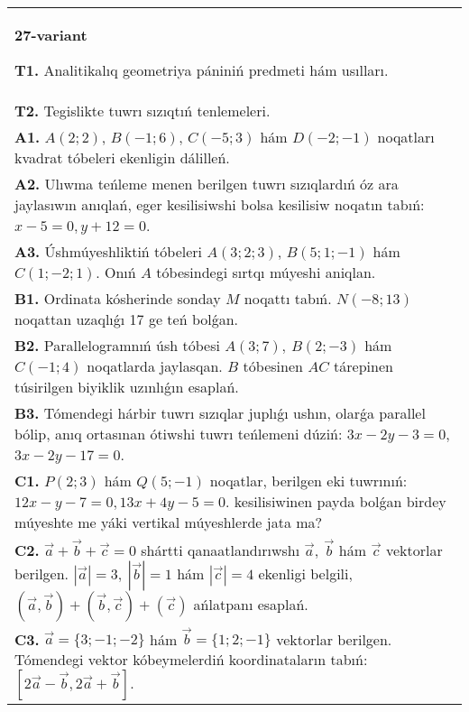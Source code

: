 \documentclass{article}
\begin{document}
\begin{tabular}{m{17cm}}
\textbf{27-variant}

\textbf{T1.} Analitikalıq geometriya pániniń predmeti hám usılları.
 \\
\textbf{T2.} 
Tegislikte tuwrı sızıqtıń tenlemeleri.
 \\
\textbf{A1.} 
$A (2;2) $, $B (-1;6) $, $C (-5;3) $ hám $D (-2;-1) $
noqatları kvadrat tóbeleri ekenligin dálilleń.
 \\
\textbf{A2.} 
Ulıwma teńleme menen berilgen tuwrı sızıqlardıń
óz ara jaylasıwın anıqlań, eger kesilisiwshi bolsa kesilisiw noqatın
tabıń: $x-5=0, y+12=0$.
 \\
\textbf{A3.} 
Úshmúyeshliktiń tóbeleri
$A (3;2; 3) $, $B (5;1; - 1) $ hám $C (1; -2;1) $. Onıń $A$ tóbesindegi sırtqı múyeshi aniqlan.
 \\
\textbf{B1.} 
Ordinata kósherinde sonday $M$ noqattı tabıń.
\(N (-8;13) \) noqattan uzaqlıǵı 17 ge teń bolǵan.
 \\
\textbf{B2.} 
Parallelogramnıń úsh tóbesi \(A (3;7),\ B (2;-3) \) hám
\(C (-1;4) \) noqatlarda jaylasqan. $B$ tóbesinen $AC$
tárepinen túsirilgen biyiklik uzınlıǵın esaplań.
 \\
\textbf{B3.} 
Tómendegi hárbir tuwrı sızıqlar juplıǵı ushın, olarǵa parallel
bólip, anıq ortasınan ótiwshi tuwrı teńlemeni dúziń: $3x-2y-3=0$, $3x-2y-17=0$.
 \\
\textbf{C1.} 
\(P (2;3) \) hám \(Q (5;-1) \) noqatlar, berilgen eki
tuwrınıń: $12x-y-7=0, 13x+4y-5=0$.
kesilisiwinen payda bolǵan birdey múyeshte me yáki vertikal 
múyeshlerde jata ma?
 \\
\textbf{C2.} 
$\vec{a} + \vec{b} + \vec{c} = 0$ shártti qanaatlandırıwshı $\vec{a},\ \vec{b}$ hám $\vec{c}$ vektorlar berilgen. $|\vec{a}| = 3,\ |\vec{b}| = 1$ hám $|\vec{c}| = 4$ ekenligi belgili, $\left(\vec{a},\vec{b} \right) + \left(\vec{b},\vec{c} \right) + (\vec{c}) $ ańlatpanı esaplań.
 \\
\textbf{C3.} 
$\vec{a} = \{ 3; - 1; - 2\}$ hám $\vec{b} = \{ 1;2; - 1\}$ vektorlar berilgen. Tómendegi vektor kóbeymelerdiń koordinataların tabıń:
$\left\lbrack 2\vec{a} - \vec{b},2\vec{a} + \vec{b} \right\rbrack$.
 \\

\end{tabular}
\vspace{1cm}
\end{document}
